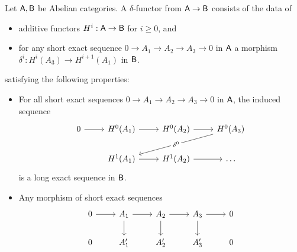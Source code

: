 \begin{definition}\label{def: delta functor}
    Let $\Asf,\Bsf$ be Abelian categories. A $\delta$-functor from $\Asf\to\Bsf$ consists of the data of 
    \begin{itemize}
        \item additive functors $H^{i}:\Asf\to\Bsf$ for $i\geq0$, and 
        \item for any short exact sequence $0\to A_{1}\to A_{2}\to A_{3}\to 0$ in $\Asf$ a morphism $\delta^{i}:H^{i}(A_{3})\to H^{i+1}(A_{1})$ in $\Bsf$.
    \end{itemize}
    satisfying the following properties:
    \begin{itemize}
        \item For all short exact sequences $0\to A_{1}\to A_{2}\to A_{3}\to 0$ in $\Asf$, the induced sequence 
        $$%
        \begin{tikzcd}
            0 & {H^{0}(A_{1})} & {H^{0}(A_{2})} & {H^{0}(A_{3})} \\
            & {H^{1}(A_{1})} & {H^{1}(A_{2})} & \dots
            \arrow[from=1-1, to=1-2]
            \arrow[from=1-2, to=1-3]
            \arrow[from=1-3, to=1-4]
            \arrow["{\delta^{0}}"{description}, from=1-4, to=2-2]
            \arrow[from=2-2, to=2-3]
            \arrow[from=2-3, to=2-4]
        \end{tikzcd}$$
        is a long exact sequence in $\Bsf$. 
        \item Any morphism of short exact sequences
        $$%
        \begin{tikzcd}
            0 & {A_{1}} & {A_{2}} & {A_{3}} & 0 \\
            0 & {A_{1}'} & {A_{2}'} & {A_{3}'} & 0
            \arrow[from=1-1, to=1-2]
            \arrow[from=1-2, to=1-3]
            \arrow[from=1-2, to=2-2]
            \arrow[from=1-3, to=1-4]
            \arrow[from=1-3, to=2-3]
            \arrow[from=1-4, to=1-5]
            \arrow[from=1-4, to=2-4]

\end{tikzcd}$$
\end{itemize}
\end{definition}

